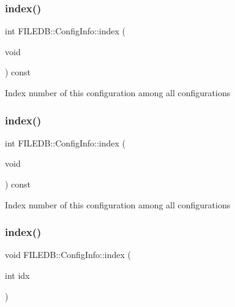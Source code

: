 \subsubsection{\texorpdfstring{index()}{index()}\hspace{0.1cm}{\footnotesize\ttfamily [2/6]}}
{\footnotesize\ttfamily int F\+I\+L\+E\+D\+B\+::\+Config\+Info\+::index (\begin{DoxyParamCaption}\item[{void}]{ }\end{DoxyParamCaption}) const}

Index number of this configuration among all configurations \mbox{\label{classFILEDB_1_1ConfigInfo_a1ea886d3469211d480bf2c26d474c365}} 
\subsubsection{\texorpdfstring{index()}{index()}\hspace{0.1cm}{\footnotesize\ttfamily [3/6]}}
{\footnotesize\ttfamily int F\+I\+L\+E\+D\+B\+::\+Config\+Info\+::index (\begin{DoxyParamCaption}\item[{void}]{ }\end{DoxyParamCaption}) const}

Index number of this configuration among all configurations \mbox{\label{classFILEDB_1_1ConfigInfo_a150cd1f4438ac651aef387d251506dc7}} 
\subsubsection{\texorpdfstring{index()}{index()}\hspace{0.1cm}{\footnotesize\ttfamily [4/6]}}
{\footnotesize\ttfamily void F\+I\+L\+E\+D\+B\+::\+Config\+Info\+::index (\begin{DoxyParamCaption}\item[{int}]{idx }\end{DoxyParamCaption})}

\mbox{\label{classFILEDB_1_1ConfigInfo_a150cd1f4438ac651aef387d251506dc7}} 
